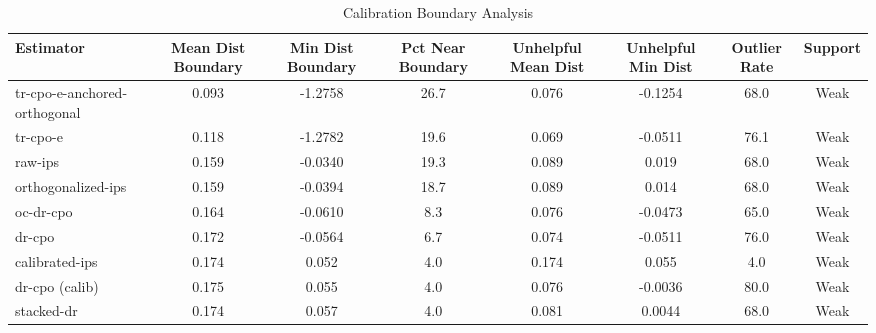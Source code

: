 \begin{table}[htbp]
\centering
\caption{Calibration Boundary Analysis}
\label{tab:A5}
\begin{tabular}{l|ccccccc}
\toprule
Estimator & Mean Dist Boundary & Min Dist Boundary & Pct Near Boundary & Unhelpful Mean Dist & Unhelpful Min Dist & Outlier Rate & Support \\
\midrule
tr-cpo-e-anchored-orthogonal & 0.093 & -1.2758 & 26.7 & 0.076 & -0.1254 & 68.0 & Weak \\
tr-cpo-e & 0.118 & -1.2782 & 19.6 & 0.069 & -0.0511 & 76.1 & Weak \\
raw-ips & 0.159 & -0.0340 & 19.3 & 0.089 & 0.019 & 68.0 & Weak \\
orthogonalized-ips & 0.159 & -0.0394 & 18.7 & 0.089 & 0.014 & 68.0 & Weak \\
oc-dr-cpo & 0.164 & -0.0610 & 8.3 & 0.076 & -0.0473 & 65.0 & Weak \\
dr-cpo & 0.172 & -0.0564 & 6.7 & 0.074 & -0.0511 & 76.0 & Weak \\
calibrated-ips & 0.174 & 0.052 & 4.0 & 0.174 & 0.055 & 4.0 & Weak \\
dr-cpo (calib) & 0.175 & 0.055 & 4.0 & 0.076 & -0.0036 & 80.0 & Weak \\
stacked-dr & 0.174 & 0.057 & 4.0 & 0.081 & 0.0044 & 68.0 & Weak \\
\bottomrule
\end{tabular}
\end{table}